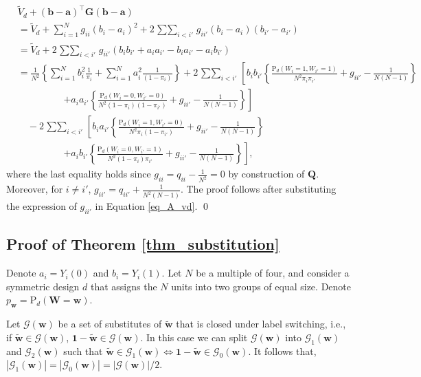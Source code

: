 \documentclass[12pt]{article}
\renewcommand{\Pr}{{\text{P}}}
\begin{document}
\begin{align}
& \tilde{V}_d + (\bm{b} - \bm{a})^\top \bm{G}(\bm{b} - \bm{a}) \nonumber\\
& = \tilde{V}_d + \sum_{i=1}^Ng_{ii}(b_i-a_i)^2 +  2\mathop{\sum\sum}_{i<i'}g_{ii'}(b_i - a_i)(b_{i'} - a_{i'}) \nonumber \\
& = \tilde{V}_d +  2\mathop{\sum\sum}_{i<i'}g_{ii'}(b_ib_{i'} + a_ia_{i'} - b_ia_{i'} - a_{i}b_{i'}) \nonumber \\
& = \frac{1}{N^2}\left\{\sum_{i=1}^{N} b^2_i \frac{1}{\pi_i} + \sum_{i=1}^{N} a^2_i \frac{1}{(1-\pi_i)} \right\} + 2\mathop{\sum\sum}_{i<i'}\left[b_ib_{i'}\left\{\frac{\Pr_d(W_i = 1,W_{i'} = 1)}{N^2\pi_i \pi_{i'}} +g_{ii'} - \frac{1}{N(N-1)}\right\} \right. \nonumber\\
& \hspace{2cm} \left. + a_ia_{i'}\left\{\frac{\Pr_d(W_i = 0,W_{i'} = 0)}{N^2(1-\pi_i) (1-\pi_{i'})} +g_{ii'}- \frac{1}{N(N-1)} \right\} \right] \nonumber \\
& \quad - 2\mathop{\sum\sum}_{i<i'}\left[b_ia_{i'}\left\{\frac{\Pr_d(W_i = 1,W_{i'} = 0)}{N^2\pi_i (1- \pi_{i'})} +g_{ii'}- \frac{1}{N(N-1)}\right\} \right. \nonumber\\
& \hspace{2cm} \left. + a_ib_{i'}\left\{\frac{\Pr_d(W_i = 0,W_{i'} = 1)}{N^2(1-\pi_i) \pi_{i'}} +g_{ii'} - \frac{1}{N(N-1)} \right\} \right], \label{eq_A_vd}
\end{align}
where the last equality holds since $g_{ii} = q_{ii} - \frac{1}{N^2} = 0$ by construction of $\bm{Q}$. Moreover, for $i\neq i'$, $g_{ii'} = q_{ii'} + \frac{1}{N^2(N-1)}$. The proof follows after substituting the expression of $g_{ii'}$ in Equation \ref{eq_A_vd}.
\qed


\subsection{Proof of Theorem \ref{thm_substitution}}

Denote $a_i = Y_i(0)$ and $b_i = Y_i(1)$. Let $N$ be a multiple of four, and consider a symmetric design $d$ that assigns the $N$ units into two groups of equal size. Denote $p_{\bm{w}} = \Pr_d(\bm{W} = \bm{w})$. 
 
Let $\mathcal{G}(\bm{w})$ be a set of substitutes of $\tilde{\bm{w}}$ that is closed under label switching, i.e., if $\tilde{\bm{w}} \in \mathcal{G}(\bm{w})$, $\bm{1} - \tilde{\bm{w}} \in \mathcal{G}(\bm{w})$. In this case we can split $\mathcal{G}(\bm{w})$ into $\mathcal{G}_1(\bm{w})$ and $\mathcal{G}_2(\bm{w})$ such that $\tilde{\bm{w}} \in \mathcal{G}_1(\bm{w}) \iff \bm{1}-\tilde{\bm{w}} \in \mathcal{G}_0(\bm{w})$. It follows that, $|\mathcal{G}_1(\bm{w})| = |\mathcal{G}_0(\bm{w})| = |\mathcal{G}(\bm{w})|/2$.
\end{document}
